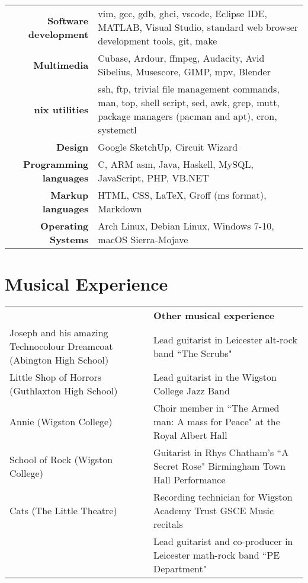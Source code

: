 \documentclass{article}
\begin{document}
{\renewcommand{\arraystretch}{2}

\begin{tabular}{ r | p{10cm} }

{\large\bfseries Software development} & {vim, gcc, gdb, ghci, vscode, Eclipse IDE, MATLAB, Visual Studio, standard web browser development tools, git, make}\\
{\large\bfseries Multimedia} & {Cubase, Ardour, ffmpeg, Audacity, Avid Sibelius, Musescore, GIMP, mpv, Blender} \\
{\large\bfseries *nix utilities} & {ssh, ftp, trivial file management commands, man, top, shell script, sed, awk, grep, mutt, package managers (pacman and apt), cron, systemctl} \\
{\large\bfseries Design} & {Google SketchUp, Circuit Wizard} \\
{\large\bfseries Programming languages} & {C, ARM asm, Java, Haskell, MySQL, JavaScript, PHP, VB.NET}\\
{\large\bfseries Markup languages} & {HTML, CSS, \LaTeX, Groff (ms format), Markdown}\\
{\large\bfseries Operating Systems} & {Arch Linux, Debian Linux, Windows 7-10, macOS Sierra-Mojave}\\


\end{tabular}

\section{Musical Experience}

{\renewcommand{\arraystretch}{1.4}

\begin{tabular}{>{\centering}p{} | >{\centering}p{} }
{\large\bfseries Shows as a pit-band guitarist} & {\large\bfseries Other musical experience}
\tabularnewline
Joseph and his amazing Technocolour Dreamcoat (Abington High School) & Lead guitarist in Leicester alt-rock band ``The Scrubs"
\tabularnewline
Little Shop of Horrors (Guthlaxton High School) & Lead guitarist in the Wigston College Jazz Band
\tabularnewline
Annie (Wigston College) & Choir member in ``The Armed man: A mass for Peace" at the Royal Albert Hall
\tabularnewline
School of Rock (Wigston College) & Guitarist in Rhys Chatham's ``A Secret Rose" Birmingham Town Hall Performance
\tabularnewline
Cats (The Little Theatre) & Recording technician for Wigston Academy Trust GSCE Music recitals
\tabularnewline
{} & Lead guitarist and co-producer in Leicester math-rock band ``PE Department"


\end{tabular}}}
\end{document}
